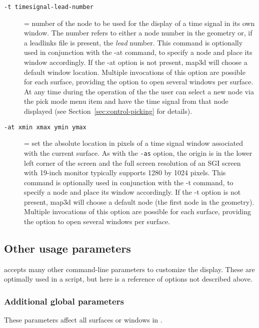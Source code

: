 \begin{description}
  \item[{\tt -t timesignal-lead-number}] = number of the node to be used
    for the display of a time signal in its own window.  The number refers
    to either a node number in the geometry or, if a leadlinks file is
    present, the \emph{lead} number.  This command is optionally used in
    conjunction with the -at command, to specify a node and place its
    window accordingly.  If the -at option is not present, map3d will
    choose a default window location.  Multiple invocations of this option
    are possible for each surface, providing the option to open several
    windows per surface.  At any time during the operation of the \map{}
    the user can select a new node via the pick mode menu item and have the
    time signal from that node displayed (see
    Section~\ref{sec:control-picking} for details).
    
  \item[{\tt-at xmin xmax ymin ymax}] = set the absolute location in pixels
    of a time signal window associated with the current surface.  As with
    the \texttt{-as} option, the origin is in the lower left corner of the
    screen and the full screen resolution of an SGI screen with 19-inch
    monitor typically supports 1280 by 1024 pixels.  This command is
    optionally used in conjunction with the -t command, to specify a node
    and place its window accordingly.  If the -t option is not present,
    map3d will choose a default node (the first node in the geometry).
    Multiple invocations of this option are possible for each surface,
    providing the option to open several windows per surface.
        
\end{description}

\subsection{Other usage parameters}
\map{} accepts many other command-line parameters to customize the display.
These are optimally used in a script, but here is a reference of options
not described above.

\subsubsection{Additional global parameters}
These parameters affect all surfaces or windows in \map{}.

